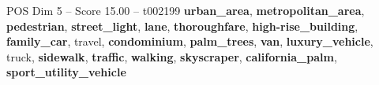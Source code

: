 \begin{textsample}{POS Dim 5 – Score 15.00 – t002199}  \label{ex:f5_pos_033}
\textbf{urban\_area}, \textbf{metropolitan\_area}, \textbf{pedestrian}, \textbf{street\_light}, \textbf{lane}, \textbf{thoroughfare}, \textbf{high-rise\_building}, \textbf{family\_car}, travel, \textbf{condominium}, \textbf{palm\_trees}, \textbf{van}, \textbf{luxury\_vehicle}, truck, \textbf{sidewalk}, \textbf{traffic}, \textbf{walking}, \textbf{skyscraper}, \textbf{california\_palm}, \textbf{sport\_utility\_vehicle}

\end{textsample}
